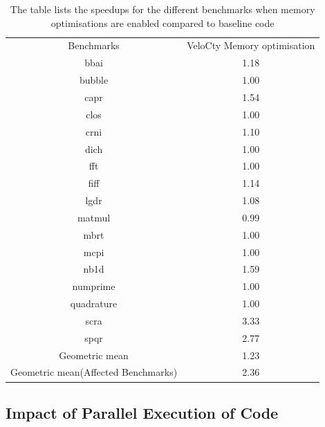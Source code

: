\begin{table}[h]
\centering
\begin{tabular}{|c|c|}
\hline
Benchmarks     & VeloCty Memory optimisation \\ \hhline{|=|=|}
bbai           & 1.18                        \\ \hline
bubble         & 1.00                        \\ \hline
capr           & 1.54                        \\ \hline
clos           & 1.00                        \\ \hline
crni           & 1.10                        \\ \hline
dich           & 1.00                        \\ \hline
fft            & 1.00                        \\ \hline
fiff           & 1.14                        \\ \hline
lgdr           & 1.08                        \\ \hline
matmul         & 0.99                        \\ \hline
mbrt           & 1.00                        \\ \hline
mcpi           & 1.00                        \\ \hline
nb1d           & 1.59                        \\ \hline
numprime       & 1.00                        \\ \hline
quadrature     & 1.00                        \\ \hline
scra           & 3.33                        \\ \hline
spqr           & 2.77                        \\ \hline
Geometric mean & 1.23                        \\ \hline
Geometric mean(Affected Benchmarks)  & 2.36                        \\ \hline
\end{tabular}
\caption[Speedup of \velocty code when memory optimisations are enabled]{The table lists the speedups for the different \matlab benchmarks when memory optimisations are enabled compared to baseline \velocty code}
\label{tab:cmvscwo}
\end{table}
\subsection{Impact of Parallel Execution of \velocty Code}

